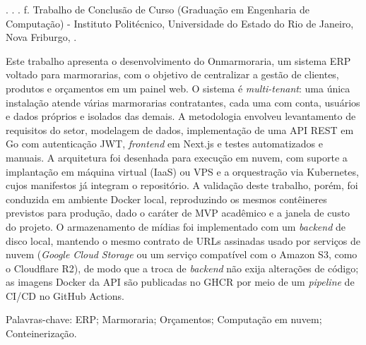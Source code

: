 \begin{resumo}
\begin{SingleSpace}

\noindent
\begin{flushleft}
\entradaAutor{}. \textit{\imprimirtitulo}. \the\year. \pageref{LastPage} f. Trabalho de Conclusão de Curso (Graduação em Engenharia de Computação) - Instituto Politécnico, Universidade do Estado do Rio de Janeiro, Nova Friburgo, \the\year.
\end{flushleft}
\vspace{\onelineskip}

\setlength{\parindent}{1.3cm}

Este trabalho apresenta o desenvolvimento do Onmarmoraria, um sistema ERP voltado para marmorarias, com o objetivo de centralizar a gestão de clientes, produtos e orçamentos em um painel web. O sistema é \textit{multi-tenant}: uma única instalação atende várias marmorarias contratantes, cada uma com conta, usuários e dados próprios e isolados das demais. A metodologia envolveu levantamento de requisitos do setor, modelagem de dados, implementação de uma API REST em Go com autenticação JWT, \textit{frontend} em Next.js e testes automatizados e manuais. A arquitetura foi desenhada para execução em nuvem, com suporte a implantação em máquina virtual (IaaS) ou VPS e a orquestração via Kubernetes, cujos manifestos já integram o repositório. A validação deste trabalho, porém, foi conduzida em ambiente Docker local, reproduzindo os mesmos contêineres previstos para produção, dado o caráter de MVP acadêmico e a janela de custo do projeto. O armazenamento de mídias foi implementado com um \textit{backend} de disco local, mantendo o mesmo contrato de URLs assinadas usado por serviços de nuvem (\textit{Google Cloud Storage} ou um serviço compatível com o Amazon S3, como o Cloudflare R2), de modo que a troca de \textit{backend} não exija alterações de código; as imagens Docker da API são publicadas no GHCR por meio de um \textit{pipeline} de CI/CD no GitHub Actions.

\vspace{\onelineskip}
\noindent Palavras-chave: ERP; Marmoraria; Orçamentos; Computação em nuvem; Conteinerização.

\end{SingleSpace}
\end{resumo}